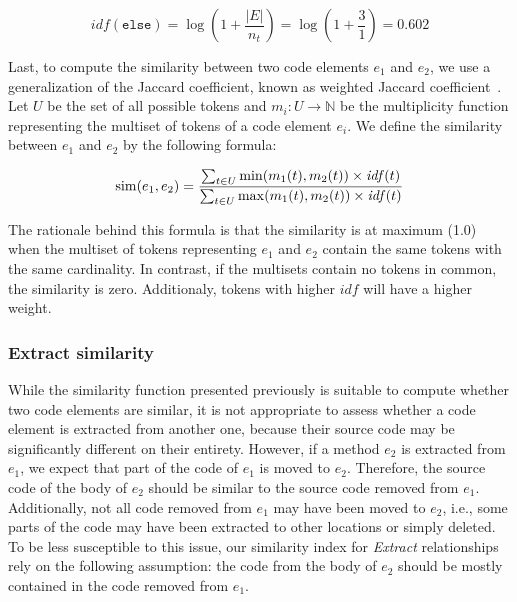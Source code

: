 \[
\mathit{idf}(\mathtt{else}) = 
\log (1 + \frac{|E|}{n_t}) = 
\log (1 + \frac{3}{1}) = 0.602
\]

Last, to compute the similarity between two code elements $e_1$ and $e_2$, we use a generalization of the Jaccard coefficient, known as weighted Jaccard coefficient~\cite{chierichetti2010finding}.
Let $U$ be the set of all possible tokens and $m_i: U \to \mathbb{N}$ be the multiplicity function representing the multiset of tokens of a code element $e_i$.
We define the similarity between $e_1$ and $e_2$ by the following formula:


\begin{align}
\label{WJaccard}
\rdsim(e_1, e_2) = \frac{\sum_{t \in U} \min(m_1(t), m_2(t)) \times \mathit{idf}(t) }
                        {\sum_{t \in U} \max(m_1(t), m_2(t)) \times \mathit{idf}(t) }
\end{align}

The rationale behind this formula is that the similarity is at maximum (1.0) when the multiset of tokens representing $e_1$ and $e_2$ contain the same tokens with the same cardinality. In contrast, if the multisets contain no tokens in common, the similarity is zero. Additionaly, tokens with higher $\mathit{idf}$ will have a higher weight.


\subsubsection{Extract similarity}
\label{SecSimX}

While the similarity function presented previously is suitable to compute whether two code elements are similar, it is not appropriate to assess whether a code element is extracted from another one, because their source code may be significantly different on their entirety.
However, if a method $e_2$ is extracted from $e_1$, we expect that part of the code of $e_1$ is moved to $e_2$.
Therefore, the source code of the body of $e_2$ should be similar to the source code removed from $e_1$.
Additionally, not all code removed from $e_1$ may have been moved to $e_2$, i.e., some parts of the code may have been extracted to other locations or simply deleted.
To be less susceptible to this issue, our similarity index for \textit{Extract} relationships rely on the following assumption: the code from the body of $e_2$ should be mostly contained in the code removed from $e_1$.

